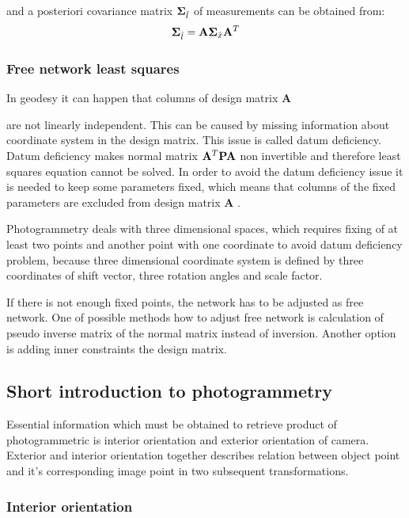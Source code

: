 \documentclass[a4paper,12pt]{article}
\newcommand{\ematr}[1]{
{\bf #1}
}
\begin{document}
and a posteriori covariance matrix $\ematr{\Sigma}_{\hat{l}}$ of measurements can be obtained from:
\begin{equation}
\ematr{\Sigma}_{\hat{l}} =  \ematr{A} \ematr{\Sigma}_{\hat{x}} \ematr{A}^{T}
\end{equation} 

\subsubsection{Free network least squares}
\label{sec:free_net_least}

In geodesy it can happen that columns of design matrix \ematr{A}
are not linearly independent. This can be caused by missing information
about coordinate system in the design matrix. This issue is called datum deficiency.
Datum deficiency makes normal matrix $ \ematr{A}^{T} \ematr{P} \ematr{A}$ non invertible and therefore 
least squares equation \label{eq:non_least_sq} cannot be solved.
In order to avoid the datum deficiency issue it is needed to keep some parameters fixed, 
which means that columns of the fixed parameters are excluded from design matrix\ematr{A}.

Photogrammetry deals with three dimensional spaces, which requires fixing of at least  
two points and another point with one coordinate to avoid datum deficiency problem, because
three dimensional coordinate system is defined by three coordinates of shift vector, three rotation angles and scale factor. 

If there is not enough fixed points, the network has to be adjusted as free network.
One of possible methods how to adjust free network is calculation of pseudo inverse matrix of the normal matrix instead of
inversion. Another option is adding inner constraints the design matrix.

\subsection{Short introduction to photogrammetry}

Essential information which must be obtained to retrieve product of photogrammetric is 
interior orientation and exterior orientation of camera.
Exterior and interior orientation together describes relation between object point and
it's corresponding image point in two subsequent transformations.

\subsubsection{Interior orientation}
\end{document}
